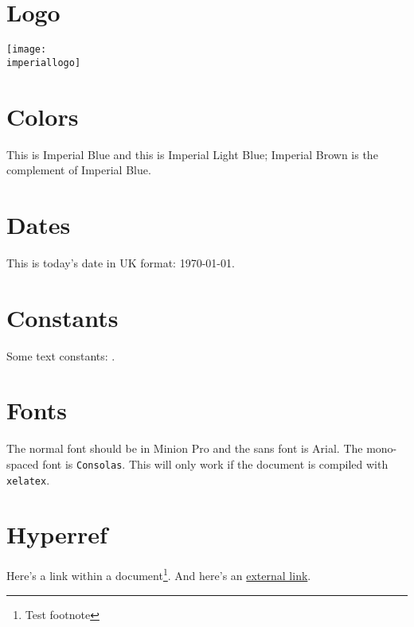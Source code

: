 \documentclass[a4paper]{article}
\begin{document}
\section*{Logo}

\texttt{[image: \\imperiallogo]}

\section*{Colors}
This is \textcolor{ImperialBlue}{Imperial Blue} and this is \textcolor{ImperialLightBlue}{Imperial Light Blue}; \textcolor{ImperialBrown}{Imperial Brown} is the complement of Imperial Blue.

\section*{Dates}
This is today's date in UK format: \today.

\section*{Constants}
Some text constants: \college.

\section*{Fonts}
The normal font should be in Minion Pro and \textsf{the sans font is Arial}.  The mono-spaced font is \texttt{Consolas}.  This will only work if the document is compiled with \texttt{xelatex}.

\section*{Hyperref}
Here's a link within a document\footnote{Test footnote}.  And here's an \href{http://www.guardian.co.uk}{external link}.
\end{document}
